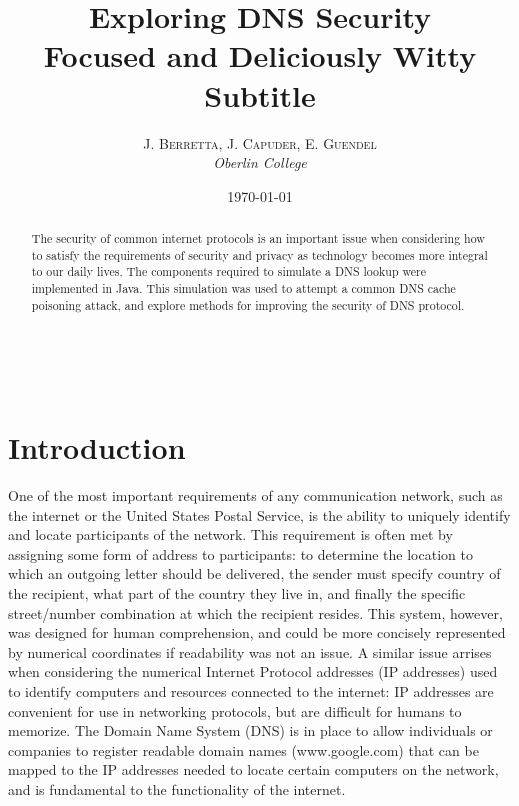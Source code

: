 \documentclass[a4paper, 12pt]{article} %
\title{\textbf{Exploring DNS Security}\\ %
Focused and Deliciously Witty Subtitle} %
\author{\textsc{J. Berretta, J. Capuder, E. Guendel} %
\\{\textit{Oberlin College}}} %
\date{\today} %
\makeatletter
\renewcommand{\maketitle}{ %
\begin{flushright} %
{\LARGE\@title} %

\vspace{30pt} %

{\large\@author} %
\\\@date %

\vspace{30pt} %
\end{flushright}
}
\makeatother
\begin{document}
\maketitle %



\begin{abstract}
The security of common internet protocols is an important issue when considering how to satisfy the requirements of security and privacy as technology becomes more integral to our daily lives. The components required to simulate a DNS lookup were implemented in Java. This simulation was used to attempt a common DNS cache poisoning attack, and explore methods for improving the security of DNS protocol.
\end{abstract}


\vspace{10pt} %


\section*{Introduction}

One of the most important requirements of any communication network, such as the internet or the United States Postal Service, is the ability to uniquely identify and locate participants of the network. This requirement is often met by assigning some form of address to participants: to determine the location to which an outgoing letter should be delivered, the sender must specify country of the recipient, what part of the country they live in, and finally the specific street/number combination at which the recipient resides. This system, however, was designed for human comprehension, and could be more concisely represented by numerical coordinates if readability was not an issue. A similar issue arrises when considering the numerical Internet Protocol addresses (IP addresses) used to identify computers and resources connected to the internet: IP addresses are convenient for use in networking protocols, but are difficult for humans to memorize. The Domain Name System (DNS) is in place to allow individuals or companies to register readable domain names (www.google.com) that can be mapped to the IP addresses\cite{Schuba} needed to locate certain computers on the network, and is fundamental to the functionality of the internet.
\end{document}
